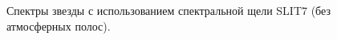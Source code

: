 \documentclass[a4paper]{article}
\begin{document}
\begin{figure}[h]
\begin{minipage}[h]{0.50\linewidth}
\end{minipage}
\begin{minipage}[h]{0.50\linewidth}
\end{minipage}
\begin{minipage}[h]{0.50\linewidth}
\end{minipage}
\begin{minipage}[h]{0.50\linewidth}
\end{minipage}
\caption{Спектры звезды с использованием спектральной щели SLIT7 (без атмосферных полос).}
\label{ris:image2}
\end{figure}
\end{document}
